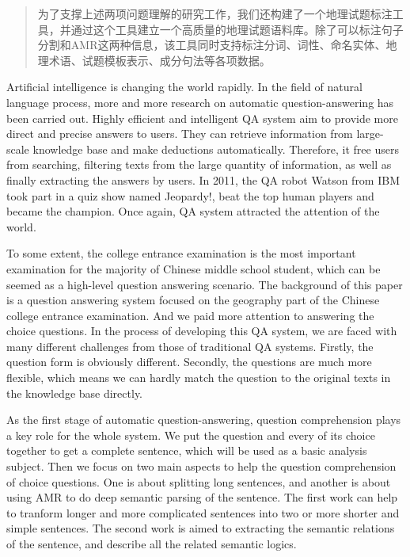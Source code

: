 \documentclass[master, winfont]{njuthesis}
\begin{document}
\begin{abstract}
为了支撑上述两项问题理解的研究工作，我们还构建了一个地理试题标注工具，并通过这个工具建立一个高质量的地理试题语料库。除了可以标注句子分割和AMR这两种信息，该工具同时支持标注分词、词性、命名实体、地理术语、试题模板表示、成分句法等各项数据。

\end{abstract}

\begin{englishabstract}
Artificial intelligence is changing the world rapidly. In the field of natural language process, more and more research on automatic question-answering has been carried out. Highly efficient and intelligent QA system aim to provide more direct and precise answers to users. They can retrieve information from large-scale knowledge base and make deductions automatically. Therefore, it free users from searching, filtering texts from the large quantity of information, as well as finally extracting the answers by users. In 2011, the QA robot Watson from IBM took part in a quiz show named Jeopardy!, beat the top human players and became the champion. Once again, QA system attracted the attention of the world.

To some extent, the college entrance examination is the most important examination for the majority of Chinese middle school student, which can be seemed as a high-level question answering scenario. The background of this paper is a question answering system focused on the geography part of the Chinese college entrance examination. And we paid more attention to answering the choice questions. In the process of developing this QA system, we are faced with many different challenges from those of traditional QA systems. Firstly, the question form is obviously different. Secondly, the questions are much more flexible, which means we can hardly match the question to the original texts in the knowledge base directly.

As the first stage of automatic question-answering, question comprehension plays a key role for the whole system. We put the question and every of its choice together to get a complete sentence, which will be used as a basic analysis subject. Then we focus on two main aspects to help the question comprehension of choice questions. One is about splitting long sentences, and another is about using AMR to do deep semantic parsing of the sentence. The first work can help to tranform longer and more complicated sentences into two or more shorter and simple sentences. The second work is aimed to extracting the semantic relations of the sentence, and describe all the related semantic logics.


\end{englishabstract}
\end{document}
